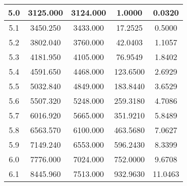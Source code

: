 \begin{table}[h!]
\begin{tabular}{|c|c|c|c|c|}
        5.0        & 3125.000       & 3124.000                          & 1.0000        & 0.0320                \\ \hline
        5.1        & 3450.250       & 3433.000                          & 17.2525       & 0.5000                \\ \hline
        5.2        & 3802.040       & 3760.000                          & 42.0403       & 1.1057                \\ \hline
        5.3        & 4181.950       & 4105.000                          & 76.9549       & 1.8402                \\ \hline
        5.4        & 4591.650       & 4468.000                          & 123.6500      & 2.6929                \\ \hline
        5.5        & 5032.840       & 4849.000                          & 183.8440      & 3.6529                \\ \hline
        5.6        & 5507.320       & 5248.000                          & 259.3180      & 4.7086                \\ \hline
        5.7        & 6016.920       & 5665.000                          & 351.9210      & 5.8489                \\ \hline
        5.8        & 6563.570       & 6100.000                          & 463.5680      & 7.0627                \\ \hline
        5.9        & 7149.240       & 6553.000                          & 596.2430      & 8.3399                \\ \hline
        6.0        & 7776.000       & 7024.000                          & 752.0000      & 9.6708                \\ \hline
        6.1        & 8445.960       & 7513.000                          & 932.9630      & 11.0463               \\ \hline
    \end{tabular}\label{tab:table2}
\end{table}

